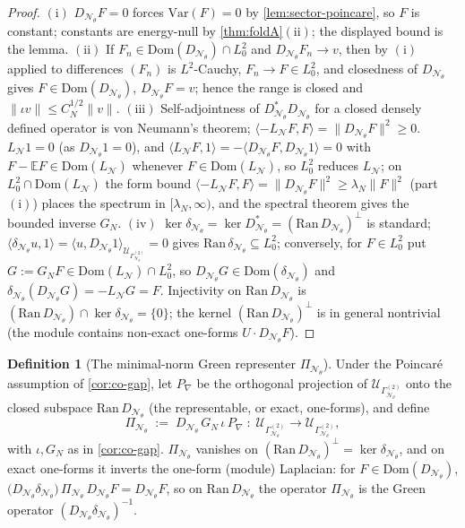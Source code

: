 \documentclass[reqno,final,11pt]{amsart}
\theoremstyle{plain}
\theoremstyle{definition}
\newtheorem{definition}[theorem]{Definition}
\theoremstyle{remark}
\newcommand{\E}{\mathbb E}
\newcommand{\Dom}{\mathrm{Dom}}
\newcommand{\cN}{\mathcal N}
\newcommand{\cU}{\mathcal U}
\newcommand{\GamN}{\Gamma^{(2)}_{\cN_\theta}}
\newcommand{\DN}{D_{\cN_\theta}}
\newcommand{\divN}{\delta_{\cN_\theta}}
\newcommand{\PiN}{\Pi_{\cN_\theta}}
\newcommand{\Ltwoz}{L^2_0}
\begin{document}
\begin{proof}
$(\mathrm i)$ $\DN F=0$ forces $\mathrm{Var}(F)=0$ by
\cref{lem:sector-poincare}, so $F$ is constant; constants are energy-null by
\cref{thm:foldA}$(\mathrm{ii})$; the displayed bound is the lemma.
$(\mathrm{ii})$ If $F_n\in\Dom(\DN)\cap\Ltwoz$ and $\DN F_n\to v$, then by
$(\mathrm i)$ applied to differences $(F_n)$ is $L^2$-Cauchy, $F_n\to F\in\Ltwoz$,
and closedness of $\DN$ gives $F\in\Dom(\DN)$, $\DN F=v$; hence the range is
closed and $\|\iota v\|\le C_N^{1/2}\|v\|$.
$(\mathrm{iii})$ Self-adjointness of $\DN^{*}\DN$ for a closed densely defined
operator is von Neumann's theorem; $\langle-L_{\cN}F,F\rangle=\|\DN F\|^2\ge0$.
$L_{\cN}1=0$ (as $\DN1=0$), and $\langle L_{\cN}F,1\rangle=-\langle\DN F,\DN
1\rangle=0$ with $F-\E F\in\Dom(L_{\cN})$ whenever $F\in\Dom(L_{\cN})$, so
$\Ltwoz$ reduces $L_{\cN}$; on $\Ltwoz\cap\Dom(L_{\cN})$ the form bound
$\langle-L_{\cN}F,F\rangle=\|\DN F\|^2\ge\lambda_N\|F\|^2$ (part $(\mathrm i)$)
places the spectrum in $[\lambda_N,\infty)$, and the spectral theorem gives the
bounded inverse $G_N$.
$(\mathrm{iv})$ $\ker\divN=\ker\DN^{*}=(\mathrm{Ran}\,\DN)^{\perp}$ is standard;
$\langle\divN u,1\rangle=\langle u,\DN1\rangle_{\cU_{\GamN}}=0$ gives
$\mathrm{Ran}\,\divN\subseteq\Ltwoz$; conversely, for $F\in\Ltwoz$ put
$G:=G_NF\in\Dom(L_{\cN})\cap\Ltwoz$, so $\DN G\in\Dom(\divN)$ and
$\divN(\DN G)=-L_{\cN}G=F$. Injectivity on $\mathrm{Ran}\,\DN$ is
$(\mathrm{Ran}\,\DN)\cap\ker\divN=\{0\}$; the kernel
$(\mathrm{Ran}\,\DN)^{\perp}$ is in general nontrivial (the module contains
non-exact one-forms $U\cdot\DN F$).
\end{proof}

\begin{definition}[The minimal-norm Green representer $\PiN$]\label{def:PiN}
Under the Poincar\'e assumption of \cref{cor:co-gap}, let $P_{\nabla}$ be the
orthogonal projection of $\cU_{\GamN}$ onto the closed subspace
$\mathrm{Ran}\,\DN$ (the representable, or exact, one-forms), and define
\[
  \PiN\;:=\;\DN\,G_N\,\iota\,P_{\nabla}\;\colon\;\cU_{\GamN}\longrightarrow\cU_{\GamN},
\]
with $\iota,G_N$ as in \cref{cor:co-gap}. $\PiN$ vanishes on
$(\mathrm{Ran}\,\DN)^{\perp}=\ker\divN$, and on exact one-forms it inverts the
one-form (module) Laplacian: for $F\in\Dom(\DN)$,
$\bigl(\DN\divN\bigr)\,\PiN\,\DN F=\DN F$, so on $\mathrm{Ran}\,\DN$ the operator
$\PiN$ is the Green operator $(\DN\divN)^{-1}$.
\end{definition}
\end{document}
